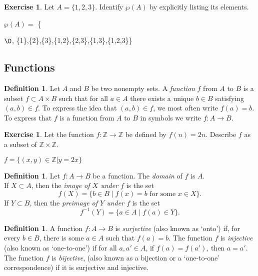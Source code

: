 \documentclass[12pt]{article}
\renewcommand{\emptyset}{\O}
\theoremstyle{definition}
\newtheorem{definition}[theorem]{Definition}
\newtheorem{exercise}[theorem]{Exercise}
\numberwithin{equation}{subsection}
\begin{document}
\begin{exercise}
Let $A=\{1,2,3\}$.  Identify $\wp(A)$ by explicitly listing its elements.
\end{exercise}
$\wp(A) = $ \{{$\emptyset$, \{{1\}},\{{2\}},\{{3\}},\{{1,2\}},\{{2,3\}},\{{1,3\}},\{{1,2,3\}}\}

\subsection*{Functions}

\begin{definition} Let $A$ and $B$ be two nonempty sets.  
A \emph{function} $f$ from $A$ to $B$ is a subset $f \subset A \times B$ such that for all $a \in A$ there exists a unique $b \in B$ satisfying $(a, b) \in f$.  To express the idea that $(a, b) \in f$, we most
often write $f(a) = b$.  To express that $f$ is a function from $A$ to $B$ in symbols we write $f \colon A \rightarrow B$.  
\end{definition}

\begin{exercise}  
Let the function $f \colon \mathbb{Z} \rightarrow \mathbb{Z}$ be defined by
$f(n)=2n$.  Describe $f$ as a subset of $\mathbb{Z} \times \mathbb{Z}$.  
\end{exercise}
$f = \{(x,y) \in \mathbb Z | y = 2x\}$
\begin{definition}  Let $f \colon A \rightarrow B$ be a function.  The \emph{domain} of $f$ is $A$.  \\
If $X \subset A$, then the \emph{image of $X$ under $f$} is the set
\[
f(X) = \{ b \in B \mid \text{$f(x) = b$ for some $x \in X$} \}.
\]
If $Y \subset B$, then the \emph{preimage of $Y$ under $f$} is the set
\[
f^{-1}(Y) = \{ a \in A \mid f(a) \in Y \}.
\]
\end{definition}

\begin{definition}  A function $f \colon A \rightarrow B$ is \emph{surjective} (also known as `onto') if, 
for every $b\in B$, there is some $a\in A$ such that $f(a) = b$.  The function $f$ is \emph{injective} (also known as `one-to-one') if for all $a, a' \in A$, if $f(a) = f(a')$, then $a = a'$.  The function $f$ is \emph{bijective}, (also known as a bijection or a `one-to-one' correspondence) if it is surjective and injective.
\end{definition}

}
\end{document}
